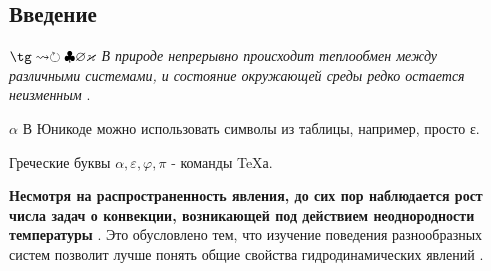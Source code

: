 \documentclass[14pt,a4paper,oneside]{extarticle}	%
\begin{document}
\newpage 	%

\setcounter{page}{3}%
\renewcommand{\contentsname}{\center{Содержание}} 	%
\tableofcontents

\newpage

	\begin{center}
		\section*{Введение} %
	\end{center}
$\tg \rightsquigarrow \circlearrowright \clubsuit\varnothing\varkappa$
\textit{В природе непрерывно происходит теплообмен между различными
системами, и состояние окружающей среды редко остается неизменным} \cite{Afanasyev92}. %



	\begin{center}
\XeTeX{}
\end{center}


$\alpha$
В Юникоде можно использовать символы из таблицы, например, просто ε.

Греческие буквы $ \alpha, \varepsilon, \varphi, \pi $ - команды \TeX{}а.

\textbf{Несмотря на распространенность явления, до сих пор наблюдается рост числа задач о конвекции, возникающей под действием неоднородности температуры} \cite{Ponomarenko86,rutherford}.
Это обусловлено тем, что изучение поведения разнообразных систем позволит лучше понять общие свойства гидродинамических явлений \cite{Belousova81,Belousova82,dixit}.
\end{document}
